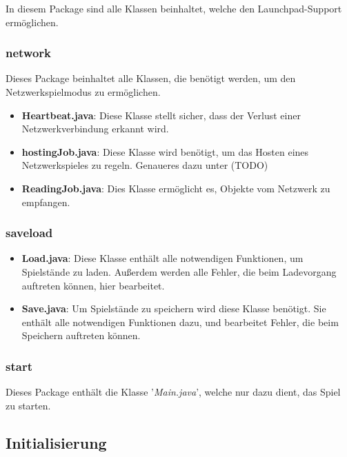 \documentclass[12pt,a4paper]{article}
\begin{document}
{In diesem Package sind alle Klassen beinhaltet, welche den Launchpad-Support ermöglichen. 


\subsubsection{network}

Dieses Package beinhaltet alle Klassen, die benötigt werden, um den Netzwerkspielmodus zu ermöglichen.

\begin{itemize}
	\item{\textbf{Heartbeat.java}: Diese Klasse stellt sicher, dass der Verlust einer Netzwerkverbindung erkannt wird.}
	\item{\textbf{hostingJob.java}: Diese Klasse wird benötigt, um das Hosten eines Netzwerkspieles zu regeln. Genaueres dazu unter (TODO)} %
	\item{\textbf{ReadingJob.java}: Dies Klasse ermöglicht es, Objekte vom Netzwerk zu empfangen. }
\end{itemize}

\subsubsection{saveload}

\begin{itemize}

	\item{\textbf{Load.java}: Diese Klasse enthält alle notwendigen Funktionen, um Spielstände zu laden. Außerdem werden alle Fehler, die beim Ladevorgang auftreten können, hier bearbeitet.  }
	
	\item{\textbf{Save.java}: Um Spielstände zu speichern wird diese Klasse benötigt. Sie enthält alle notwendigen Funktionen dazu, und bearbeitet Fehler, die beim Speichern auftreten können. }


\end{itemize}

\subsubsection{start}

Dieses Package enthält die Klasse '\textit{Main.java}', welche nur dazu dient, das Spiel zu starten.

\newpage
\subsection{Initialisierung}
\label{SUBSEC:INIT}

}
\end{document}
